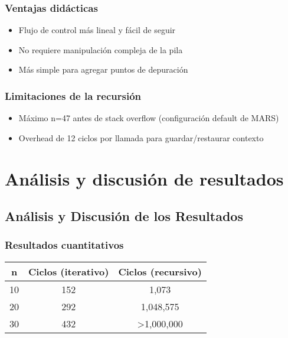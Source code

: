 \documentclass{article}
\begin{document}
\subsubsection*{Ventajas didácticas}
\begin{itemize}[leftmargin=*]
    \item Flujo de control más lineal y fácil de seguir
    \item No requiere manipulación compleja de la pila
    \item Más simple para agregar puntos de depuración
\end{itemize}

\subsubsection*{Limitaciones de la recursión}
\begin{itemize}[leftmargin=*]
    \item Máximo n=47 antes de stack overflow (configuración default de MARS)
    \item Overhead de 12 ciclos por llamada para guardar/restaurar contexto
\end{itemize}

\section{Análisis y discusión de resultados}

\subsection{Análisis y Discusión de los Resultados}

\subsubsection*{Resultados cuantitativos}
\begin{center}
\begin{tabular}{|c|c|c|}
\hline
\textbf{n} & \textbf{Ciclos (iterativo)} & \textbf{Ciclos (recursivo)} \\
\hline
10 & 152 & 1,073 \\
20 & 292 & 1,048,575 \\
30 & 432 & >1,000,000 \\
\hline
\end{tabular}
\end{center}
\end{document}

